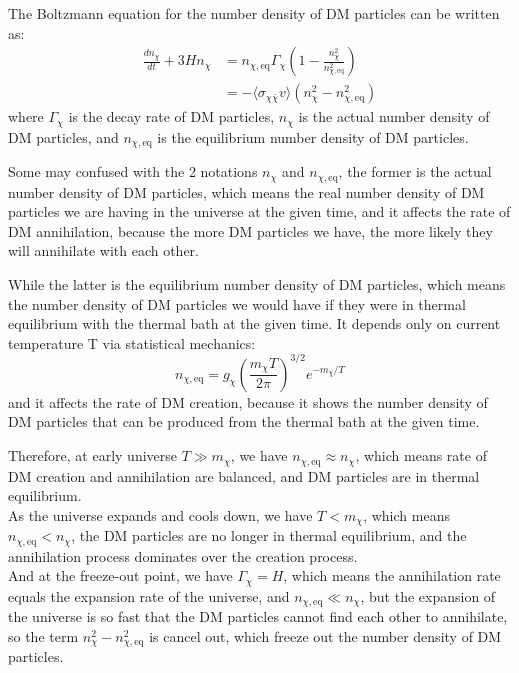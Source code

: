 \bigskip \noindent
\begin{theory}
    The Boltzmann equation for the number density of DM particles can be written as:
    \begin{align*}
        \frac{dn_\chi}{dt} + 3H n_\chi &= n_{\chi,\mathrm{eq}} \Gamma_\chi \left( 1 - \frac{n_\chi^2}{n_{\chi,\mathrm{eq}}^2} \right) \\
        &= - \langle \sigma_{\chi \bar{\chi}} v \rangle (n_\chi^2 - n_{\chi,\mathrm{eq}}^2)
    \end{align*}
    where $\Gamma_\chi$ is the decay rate of DM particles, $n_\chi$ is the actual number density of DM particles, and $n_{\chi,\mathrm{eq}}$ is the equilibrium number density of DM particles.
\end{theory}
    
\bigskip \noindent
\begin{importantnote}
    Some may confused with the 2 notations $n_\chi$ and $n_{\chi,\mathrm{eq}}$, the former is the actual number density of DM particles, which means the real number density of DM particles we are having in the universe at the given time, and it affects the rate of DM annihilation, because the more DM particles we have, the more likely they will annihilate with each other.

    While the latter is the equilibrium number density of DM particles, which means the number density of DM particles we would have if they were in thermal equilibrium with the thermal bath at the given time. It depends only on current temperature T via statistical mechanics: 
    \[
        n_{\chi,\mathrm{eq}} = g_\chi \left( \frac{m_\chi T}{2\pi} \right)^{3/2} e^{-m_\chi/T}
    \]
    and it affects the rate of DM creation, because it shows the number density of DM particles that can be produced from the thermal bath at the given time.
\end{importantnote}

\bigskip \noindent
\begin{intuition}
     Therefore, at early universe $T \gg m_\chi$, we have $n_{\chi,\mathrm{eq}} \approx n_\chi$, which means rate of DM creation and annihilation are balanced, and DM particles are in thermal equilibrium. \\
    
    As the universe expands and cools down, we have $T < m_\chi$, which means $n_{\chi,\mathrm{eq}} < n_\chi$, the DM particles are no longer in thermal equilibrium, and the annihilation process dominates over the creation process. \\
    
    And at the freeze-out point, we have $\Gamma_\chi = H$, which means the annihilation rate equals the expansion rate of the universe, and $n_{\chi,\mathrm{eq}} \ll n_\chi$, but the expansion of the universe is so fast that the DM particles cannot find each other to annihilate, so the term $n_\chi^2 - n_{\chi,\mathrm{eq}}^2$ is cancel out, which freeze out the number density of DM particles.
\end{intuition}

